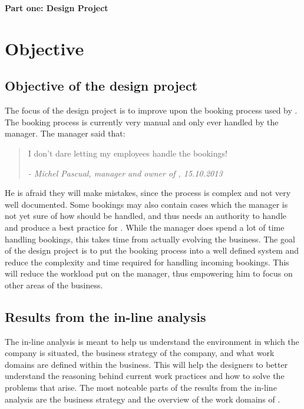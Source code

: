 \textbf{\LARGE{Part one: Design Project}}

\section{Objective}

\subsection{Objective of the design project}
The focus of the design project is to improve upon the booking process used by 
\gomonkey. The booking process is currently very manual and only ever handled by 
the manager. The manager said that: 

\begin{quotation}
I don't dare letting my employees handle the bookings!

\em - Michel Pascual, manager and owner of \gomonkey, 15.10.2013
\end{quotation}

He is afraid they will make mistakes, since the process is complex and not very 
well documented. Some bookings may also contain cases which the manager is not 
yet sure of how should be handled, and thus needs an authority to handle and  
produce a best practice for \gomonkey{}. While the manager does spend a lot of
time handling bookings, this takes time from actually evolving the business.
The goal of the design project is to put the booking process into a 
well defined system and reduce the complexity and time required for handling
incoming bookings. This will reduce the workload put on the manager, thus 
empowering him to focus on other areas of the business.

\subsection{Results from the in-line analysis}
The in-line analysis is meant to help us understand the environment in which 
the company is situated, the business strategy of the company, and what work
domains are defined within the business. This will help the designers to
better understand the reasoning behind current work practices and how to 
solve the problems that arise. The most noteable parts of the results from 
the in-line analysis are the business strategy and the overview of the work 
domains of \gomonkey{}.

